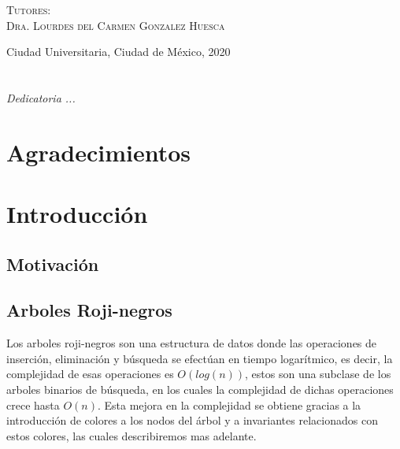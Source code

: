 \documentclass[letterpaper,12pt,oneside]{book}
\newcommand{\arns}{arboles roji-negros}
\theoremstyle{plain}
\theoremstyle{definition}
\theoremstyle{remark}
\begin{document}
\begin{titlepage}
\begin{minipage}[c][0.81\textheight][t]{0.75\textwidth}
\begin{center}
\vspace{0.5cm}

{\large\scshape Tutores:\\[0.3cm] {Dra. Lourdes del Carmen Gonzalez Huesca}}\\[.2in]

\vspace{0.5cm}

\large{Ciudad Universitaria, Ciudad de México,}{ }{2020}
\end{center}
\end{minipage}
\end{titlepage}



\frontmatter
\chapter*{}
\begin{flushright}%
\emph{Dedicatoria ...}
\thispagestyle{empty}
\end{flushright}

\chapter{Agradecimientos}

\tableofcontents
\listoffigures


\mainmatter

\chapter{Introducción} 
\section{Motivación}
\section{Arboles Roji-negros}
Los {\arns} son una estructura de datos donde las operaciones de inserci\'on, eliminaci\'on y 
búsqueda se efectúan
en tiempo logarítmico, es decir, la complejidad de esas operaciones es $O(log(n))$, estos son una 
subclase de los
arboles binarios de búsqueda, en los cuales la complejidad de dichas operaciones crece hasta $O(n)$. Esta
mejora en la complejidad se obtiene 
gracias a la introducción de colores a los nodos del \'arbol y a invariantes relacionados con estos 
colores, las cuales describiremos 
mas adelante.
\end{document}
